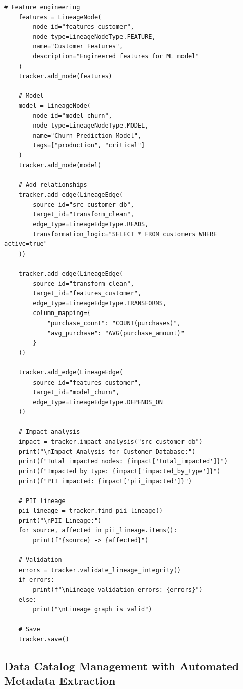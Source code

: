 \begin{lstlisting}[style=python, caption={Automated data lineage tracking system}]
    # Feature engineering
    features = LineageNode(
        node_id="features_customer",
        node_type=LineageNodeType.FEATURE,
        name="Customer Features",
        description="Engineered features for ML model"
    )
    tracker.add_node(features)

    # Model
    model = LineageNode(
        node_id="model_churn",
        node_type=LineageNodeType.MODEL,
        name="Churn Prediction Model",
        tags=["production", "critical"]
    )
    tracker.add_node(model)

    # Add relationships
    tracker.add_edge(LineageEdge(
        source_id="src_customer_db",
        target_id="transform_clean",
        edge_type=LineageEdgeType.READS,
        transformation_logic="SELECT * FROM customers WHERE active=true"
    ))

    tracker.add_edge(LineageEdge(
        source_id="transform_clean",
        target_id="features_customer",
        edge_type=LineageEdgeType.TRANSFORMS,
        column_mapping={
            "purchase_count": "COUNT(purchases)",
            "avg_purchase": "AVG(purchase_amount)"
        }
    ))

    tracker.add_edge(LineageEdge(
        source_id="features_customer",
        target_id="model_churn",
        edge_type=LineageEdgeType.DEPENDS_ON
    ))

    # Impact analysis
    impact = tracker.impact_analysis("src_customer_db")
    print("\nImpact Analysis for Customer Database:")
    print(f"Total impacted nodes: {impact['total_impacted']}")
    print(f"Impacted by type: {impact['impacted_by_type']}")
    print(f"PII impacted: {impact['pii_impacted']}")

    # PII lineage
    pii_lineage = tracker.find_pii_lineage()
    print("\nPII Lineage:")
    for source, affected in pii_lineage.items():
        print(f"{source} -> {affected}")

    # Validation
    errors = tracker.validate_lineage_integrity()
    if errors:
        print(f"\nLineage validation errors: {errors}")
    else:
        print("\nLineage graph is valid")

    # Save
    tracker.save()
\end{lstlisting}

\subsection{Data Catalog Management with Automated Metadata Extraction}

